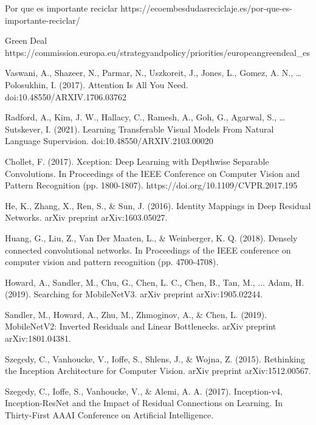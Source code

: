 \documentclass[10pt,a4paper,twocolumn,twoside]{article}
\begin{document}
\begin{thebibliography}{11}

Por que es importante reciclar https://ecoembesdudasreciclaje.es/por-que-es-importante-reciclar/

Green Deal https://commission.europa.eu/strategy\-and\-policy/priorities/european\-green\-deal\_es

Vaswani, A., Shazeer, N., Parmar, N., Uszkoreit, J., Jones, L., Gomez, A. N., … Polosukhin, I. (2017). Attention Is All You Need. doi:10.48550/ARXIV.1706.03762

Radford, A., Kim, J. W., Hallacy, C., Ramesh, A., Goh, G., Agarwal, S., … Sutskever, I. (2021). Learning Transferable Visual Models From Natural Language Supervision. doi:10.48550/ARXIV.2103.00020

Chollet, F. (2017). Xception: Deep Learning with Depthwise Separable Convolutions. In Proceedings of the IEEE Conference on Computer Vision and Pattern Recognition (pp. 1800-1807). https://doi.org/10.1109/CVPR.2017.195

He, K., Zhang, X., Ren, S., \& Sun, J. (2016). Identity Mappings in Deep Residual Networks. arXiv preprint arXiv:1603.05027.

Huang, G., Liu, Z., Van Der Maaten, L., \& Weinberger, K. Q. (2018). Densely connected convolutional networks. In Proceedings of the IEEE conference on computer vision and pattern recognition (pp. 4700-4708).

Howard, A., Sandler, M., Chu, G., Chen, L. C., Chen, B., Tan, M., ... Adam, H. (2019). Searching for MobileNetV3. arXiv preprint arXiv:1905.02244.

Sandler, M., Howard, A., Zhu, M., Zhmoginov, A., \& Chen, L. (2019). MobileNetV2: Inverted Residuals and Linear Bottlenecks. arXiv preprint arXiv:1801.04381.

Szegedy, C., Vanhoucke, V., Ioffe, S., Shlens, J., \& Wojna, Z. (2015). Rethinking the Inception Architecture for Computer Vision. arXiv preprint arXiv:1512.00567.

Szegedy, C., Ioffe, S., Vanhoucke, V., \& Alemi, A. A. (2017). Inception-v4, Inception-ResNet and the Impact of Residual Connections on Learning. In Thirty-First AAAI Conference on Artificial Intelligence.


\end{thebibliography}
\end{document}
